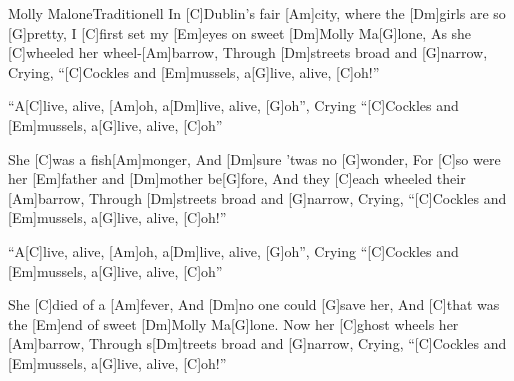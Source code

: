 \documentclass[../main.tex]{subfiles}
\begin{document}
\begin{song}{Molly Malone}{Traditionell}{}
In [C]Dublin's fair [Am]city,
where the [Dm]girls are so [G]pretty,
I [C]first set my [Em]eyes on sweet [Dm]Molly Ma[G]lone,
As she [C]wheeled her wheel-[Am]barrow,
Through [Dm]streets broad and [G]narrow,
Crying, ``[C]Cockles and [Em]mussels, a[G]live, alive, [C]oh!''

``A[C]live, alive, [Am]oh, a[Dm]live, alive, [G]oh'',
Crying ``[C]Cockles and [Em]mussels, a[G]live, alive, [C]oh''

She [C]was a fish[Am]monger,
And [Dm]sure 'twas no [G]wonder,
For [C]so were her [Em]father and [Dm]mother be[G]fore,
And they [C]each wheeled their [Am]barrow,
Through [Dm]streets broad and [G]narrow,
Crying, ``[C]Cockles and [Em]mussels, a[G]live, alive, [C]oh!''

``A[C]live, alive, [Am]oh, a[Dm]live, alive, [G]oh'',
Crying ``[C]Cockles and [Em]mussels, a[G]live, alive, [C]oh''

She [C]died of a [Am]fever,
And [Dm]no one could [G]save her,
And [C]that was the [Em]end of sweet [Dm]Molly Ma[G]lone.
Now her [C]ghost wheels her [Am]barrow,
Through s[Dm]treets broad and [G]narrow,
Crying, ``[C]Cockles and [Em]mussels, a[G]live, alive, [C]oh!''
\end{song}
\end{document}
